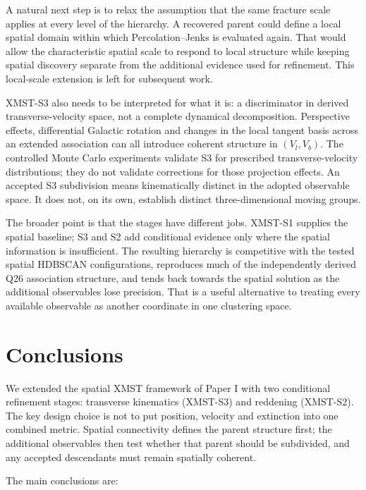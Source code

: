 \documentclass[fleqn,usenatbib]{rasti}
\begin{document}
A natural next step is to relax the assumption that the same fracture scale applies at every level of the hierarchy. A recovered parent could define a local spatial domain within which Percolation--Jenks is evaluated again. That would allow the characteristic spatial scale to respond to local structure while keeping spatial discovery separate from the additional evidence used for refinement. This local-scale extension is left for subsequent work.

XMST-S3 also needs to be interpreted for what it is: a discriminator in derived transverse-velocity space, not a complete dynamical decomposition. Perspective effects, differential Galactic rotation and changes in the local tangent basis across an extended association can all introduce coherent structure in $(V_l,V_b)$. The controlled Monte Carlo experiments validate S3 for prescribed transverse-velocity distributions; they do not validate corrections for those projection effects. An accepted S3 subdivision means kinematically distinct in the adopted observable space. It does not, on its own, establish distinct three-dimensional moving groups.

The broader point is that the stages have different jobs. XMST-S1 supplies the spatial baseline; S3 and S2 add conditional evidence only where the spatial information is insufficient. The resulting hierarchy is competitive with the tested spatial HDBSCAN configurations, reproduces much of the independently derived Q26 association structure, and tends back towards the spatial solution as the additional observables lose precision. That is a useful alternative to treating every available observable as another coordinate in one clustering space.

\section{Conclusions}

We extended the spatial XMST framework of Paper I with two conditional refinement stages: transverse kinematics (XMST-S3) and reddening (XMST-S2). The key design choice is not to put position, velocity and extinction into one combined metric. Spatial connectivity defines the parent structure first; the additional observables then test whether that parent should be subdivided, and any accepted descendants must remain spatially coherent.

The main conclusions are:
\end{document}
